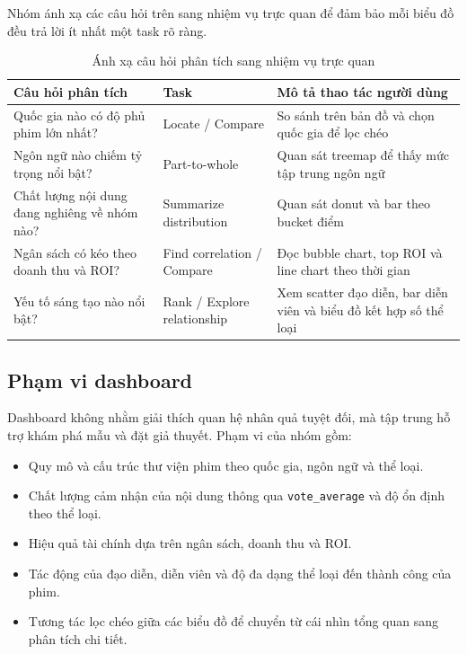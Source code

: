 Nhóm ánh xạ các câu hỏi trên sang nhiệm vụ trực quan để đảm bảo mỗi biểu đồ đều trả lời ít nhất một task rõ ràng.
\begin{table}[H]
\centering
\renewcommand{\arraystretch}{1.3}
\begin{tabularx}{\textwidth}{|p{4.8cm}|p{3cm}|X|}
\hline
\textbf{Câu hỏi phân tích} & \textbf{Task} & \textbf{Mô tả thao tác người dùng} \\
\hline
Quốc gia nào có độ phủ phim lớn nhất? & Locate / Compare & So sánh trên bản đồ và chọn quốc gia để lọc chéo \\
\hline
Ngôn ngữ nào chiếm tỷ trọng nổi bật? & Part-to-whole & Quan sát treemap để thấy mức tập trung ngôn ngữ \\
\hline
Chất lượng nội dung đang nghiêng về nhóm nào? & Summarize distribution & Quan sát donut và bar theo bucket điểm \\
\hline
Ngân sách có kéo theo doanh thu và ROI? & Find correlation / Compare & Đọc bubble chart, top ROI và line chart theo thời gian \\
\hline
Yếu tố sáng tạo nào nổi bật? & Rank / Explore relationship & Xem scatter đạo diễn, bar diễn viên và biểu đồ kết hợp số thể loại \\
\hline
\end{tabularx}
\caption{Ánh xạ câu hỏi phân tích sang nhiệm vụ trực quan}
\end{table}

\subsection{Phạm vi dashboard}
Dashboard không nhằm giải thích quan hệ nhân quả tuyệt đối, mà tập trung hỗ trợ khám phá mẫu và đặt giả thuyết. Phạm vi của nhóm gồm:
\begin{itemize}[leftmargin=2em]
    \item Quy mô và cấu trúc thư viện phim theo quốc gia, ngôn ngữ và thể loại.
    \item Chất lượng cảm nhận của nội dung thông qua \texttt{vote\_average} và độ ổn định theo thể loại.
    \item Hiệu quả tài chính dựa trên ngân sách, doanh thu và ROI.
    \item Tác động của đạo diễn, diễn viên và độ đa dạng thể loại đến thành công của phim.
    \item Tương tác lọc chéo giữa các biểu đồ để chuyển từ cái nhìn tổng quan sang phân tích chi tiết.
\end{itemize}
